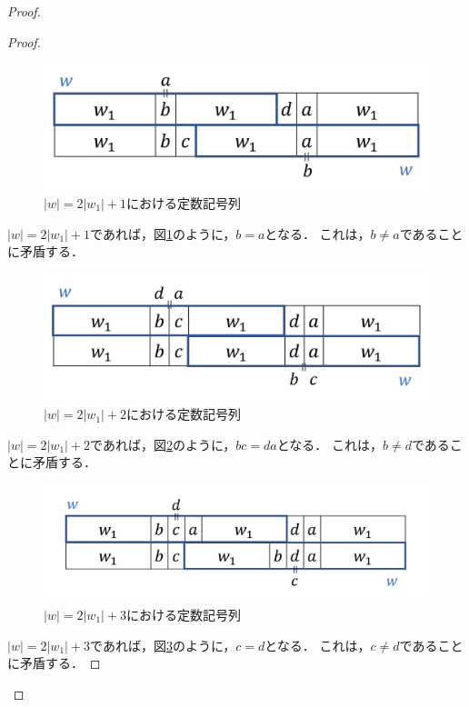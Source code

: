 \begin{proof}
\begin{proof}
\begin{figure}[H]
\includegraphics[width=\linewidth]{画像/追加部分13.png}
\caption{$|w| = 2|w_{1}|+1$における定数記号列}
\label{追加部分13}
\end{figure}

$|w|=2|w_{1}|+1$であれば，図\ref{追加部分13}のように，$b=a$となる．
これは，$b \not = a$であることに矛盾する．

\begin{figure}[H]
\includegraphics[width=\linewidth]{画像/追加部分12.png}
\caption{$|w| = 2|w_{1}|+2$における定数記号列}
\label{追加部分12}
\end{figure}

$|w|=2|w_{1}|+2$であれば，図\ref{追加部分12}のように，$bc=da$となる．
これは，$b \not = d$であることに矛盾する．

\begin{figure}[H]
\includegraphics[width=\linewidth]{画像/追加部分11.png}
\caption{$|w| = 2|w_{1}|+3$における定数記号列}
\label{追加部分11}
\end{figure}

$|w|=2|w_{1}|+3$であれば，図\ref{追加部分11}のように，$c=d$となる．
これは，$c \not = d$であることに矛盾する．


\end{proof}
\end{proof}
